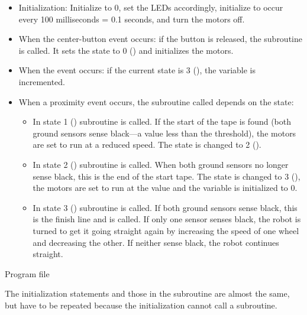 \begin{itemize}

\item Initialization: Initialize  to 0, set the LEDs
accordingly, initialize  to occur every 100 milliseconds = 0.1
seconds, and turn the motors off.

\item When the center-button event occurs: if the button is released,
the subroutine  is called. It sets the state to 0 () and
initializes the motors.

\item When the  event occurs: if the current state is 3
(), the variable  is incremented.

\item When a proximity event occurs, the subroutine called depends on
the state:

\begin{itemize}

\item In state 1 () subroutine  is called. If
the start of the tape is found (both ground sensors sense black---a
value less than the threshold), the motors are set to run at a reduced
speed. The state is changed to 2 ().

\item In state 2 () subroutine  is
called. When both ground sensors no longer sense black, this is the end
of the start tape. The state is changed to 3 (), the motors
are set to run at the value  and the variable  is
initialized to 0.

\item In state 3 () subroutine  is
called. If both ground sensors sense black, this is the finish line and
 is called. If only one sensor senses black, the robot is turned
to get it going straight again by increasing the speed of one wheel and
decreasing the other. If neither sense black, the robot continues
straight.

\end{itemize}
\end{itemize}


{\raggedleft \hfill Program file }

The initialization statements and those in the subroutine  are
almost the same, but have to be repeated because the initialization
cannot call a subroutine.

